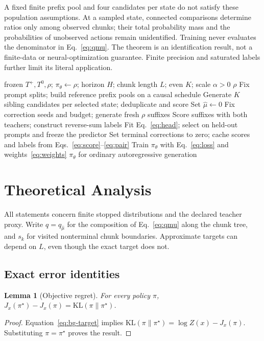 \documentclass[pdflatex,sn-mathphys-num,review]{sn-jnl}
\theoremstyle{thmstyleone}
\newtheorem{lemma}[theorem]{Lemma}
\theoremstyle{thmstyletwo}
\theoremstyle{thmstylethree}
\providecommand{\Tp}{T^{+}}
\providecommand{\Tz}{T^{0}}
\providecommand{\pth}{\pi_{\theta}}
\providecommand{\popt}{\pi^{\star}}
\providecommand{\KL}{\mathrm{KL}}
\providecommand{\muhat}{\widehat{\mu}}
\begin{document}
A fixed finite prefix pool and four candidates per state do not satisfy these population assumptions. At a sampled state, connected comparisons determine ratios only among observed chunks; their total probability mass and the probabilities of unobserved actions remain unidentified. Training never evaluates the denominator in Eq.~\eqref{eq:qmu}. The theorem is an identification result, not a finite-data or neural-optimization guarantee. Finite precision and saturated labels further limit its literal application.

\begin{algorithm}[t]
\caption{ChunkRatio-PD with a frozen correction predictor}
\label{alg:crpd}
\begin{algorithmic}[1]
\Require frozen $\Tp,\Tz,\rho$; $\pth\gets\rho$; horizon $H$; chunk length $L$; even $K$; scale $\alpha>0$
\If{verified $\Tp=\Tz$}\State \Return $\rho$\EndIf
\State Fix prompt splits; build reference prefix pools on a causal schedule
\State Generate $K$ sibling candidates per selected state; deduplicate and score
\If{verified $\rho=\Tz$}
\State Set $\muhat\gets0$
\Else
\State Fix correction seeds and budget; generate fresh $\rho$ suffixes
\State Score suffixes with both teachers; construct reverse-sum labels
\State Fit Eq.~\eqref{eq:head}; select on held-out prompts and freeze the predictor
\EndIf
\State Set terminal corrections to zero; cache scores and labels from Eqs.~\eqref{eq:score}--\eqref{eq:pair}
\State Train $\pth$ with Eq.~\eqref{eq:loss} and weights~\eqref{eq:weights}
\State \Return $\pth$ for ordinary autoregressive generation
\end{algorithmic}
\end{algorithm}

\section{Theoretical Analysis}
\label{sec:theory}
All statements concern finite stopped distributions and the declared teacher proxy. Write $q=q_{\muhat}$ for the composition of Eq.~\eqref{eq:qmu} along the chunk tree, and $s_k$ for visited nonterminal chunk boundaries. Approximate targets can depend on $L$, even though the exact target does not.

\subsection{Exact error identities}
\begin{lemma}[Objective regret]
\label{lem:regret}
For every policy $\pi$, $J_x(\popt)-J_x(\pi)=\KL(\pi\|\popt)$.
\end{lemma}
\begin{proof}
Equation~\eqref{eq:bg-target} implies $\KL(\pi\|\popt)=\log Z(x)-J_x(\pi)$. Substituting $\pi=\popt$ proves the result.
\end{proof}
\end{document}
